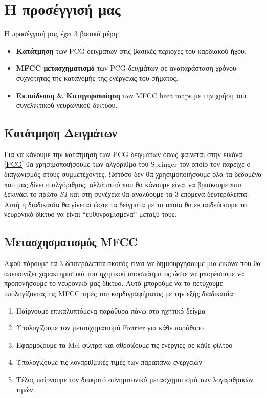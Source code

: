 \section{Η προσέγγισή μας}\label{our_approach}

Η προσέγγισή μας έχει 3 βασικά μέρη:
\begin{itemize}
	\item \textbf{Κατάτμηση} των PCG δειγμάτων στις βασικές περιοχές του καρδιακού
	      ήχου.
	\item \textbf{MFCC μετασχηματισμό} των PCG δειγμάτων σε αναπαράσταση
	      χρόνου-συχνότητας της κατανομής της ενέργειας του σήματος.
	\item \textbf{Εκπαίδευση \& Κατηγοροποίηση} των MFCC heat maps με την χρήση
	      του συνελικτικού νευρωνικού δικτύου.
\end{itemize}

\subsection{Κατάτμηση Δειγμάτων}

Για να κάνουμε την κατάτμηση των PCG δειγμάτων όπως φαίνεται στην εικόνα
\ref{PCG} θα χρησιμοποιήσουμε των αλγόριθμο του Springer
\cite{springer2015logistic} τον οποίο τον παρείχε ο διαγωνισμός στους
συμμετέχοντες. Ωστόσο δεν θα χρησιμοποιήσουμε όλα τα δεδομένα που μας δίνει ο
αλγόριθμος, αλλά αυτό που θα κάνουμε είναι να βρίσκουμε που ξεκινάει το πρώτο
\emph{S1} και στη συνέχεια θα αναλύουμε τα 3 επόμενα δευτερόλεπτα. Αυτή η
διαδικασία θα γίνεται ώστε τα δείγματα με τα οποία θα εκπαιδεύσουμε το νευρονικό
δίκτυο να είναι ``ευθυγραμισμένα'' μεταξύ τους.


\subsection{Μετασχησματισμός MFCC}

Αφού πάρουμε τα 3 δευτερόλεπτα σκοπός είναι να δημιουργήσουμε μια εικόνα που θα
απεικονίζει χαρακτηριστικά του ηχητικού αποσπάσματος ώστε να μπορέσουμε να
προπονήσουμε το νευρονικό μας δίκτυο. Αυτό μπορούμε να το πετύχουμε
υπολογίζοντας τις MFCC τιμές του καρδιγραφήματος με την εξής διαδικασία:

\begin{enumerate}
	\item Παίρνουμε επικαλυπτόμενα παράθυρα πάνω στο ηχητικό δείγμα
	\item Υπολογίζουμε τον μετασχηματισμό Fourier για κάθε παράθυρο
	\item Εφαρμόζουμε τα Mel φίλτρα και αθροίζουμε τις ενέργιες σε κάθε φίλτρο
	\item Υπολογίζουμε τις λογαριθμικές τιμές των παραπάνω ενεργειών
	\item Τέλος παίρνουμε τον διακριτό συνημιτονικό μετασχηματισμό των λογαριθμικών
	      τιμών.
\end{enumerate}


